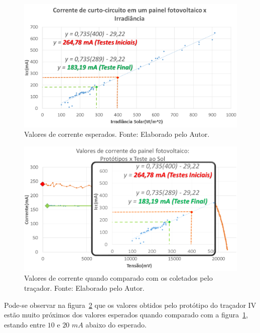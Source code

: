 \FloatBarrier
\begin{figure}[!htbp]
	\centering
	\includegraphics[scale=0.45]{imagens/Iccs.png}
	\caption{Valores de corrente esperados. Fonte: Elaborado pelo Autor. 	}
	\label{fig:Iccs}
\end{figure}
\FloatBarrier

\FloatBarrier
\begin{figure}[!htbp]
	\centering
	\includegraphics[scale=0.45]{imagens/IccIV.png}
	\caption{Valores de corrente quando comparado com os coletados pelo traçador. Fonte: Elaborado pelo Autor. 	}
	\label{fig:IccIV}
\end{figure}
\FloatBarrier

Pode-se observar na figura~\ref{fig:IccIV} que os valores obtidos pelo protótipo do traçador IV estão muito próximos dos valores esperados quando comparado com a figura~\ref{fig:Iccs}, estando entre $10$ e $20$ $mA$ abaixo do esperado.
\openany

